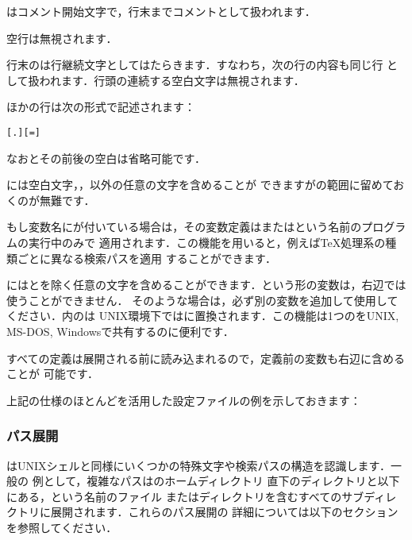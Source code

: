 \documentclass[uplatex,dvipdfmx]{jsarticle}
\begin{document}
\begin{itemize*}
\item \code{\%}はコメント開始文字で，行末までコメントとして扱われます．
\item 空行は無視されます．
\item 行末の\code{\bs}は行継続文字としてはたらきます．すなわち，次の行の内容も同じ行
  として扱われます．行頭の連続する空白文字は無視されます．
\item ほかの行は次の形式で記述されます：
%
\begin{alltt}
  [.] [=] 
\end{alltt}
%
  なお\samp{=}とその前後の空白は省略可能です．
\item {}には空白文字，\samp{=}，以外の任意の文字を含めることが
  できますがの範囲に留めておくのが無難です．
\item もし変数名にが付いている場合は，その変数定義はまたはという名前のプログラムの実行中のみで
  適用されます．この機能を用いると，例えば\TeX 処理系の種類ごとに異なる検索パスを適用
  することができます．
\item {}には\samp{\%}とを除く任意の文字を含めることができます．という形の変数は，右辺では使うことができません．
  そのような場合は，必ず別の変数を追加して使用してください．内の\samp{;}は
  UNIX環境下では\samp{:}に置換されます．この機能は1つのをUNIX, MS-DOS,
  Windowsで共有するのに便利です．
\item すべての定義は展開される前に読み込まれるので，定義前の変数も右辺に含めることが
  可能です．
\end{itemize*}
%
上記の仕様のほとんどを活用した設定ファイルの例を示しておきます：
%


\subsubsection{パス展開}
\label{sec:path-expansion}

\KPS はUNIXシェルと同様にいくつかの特殊文字や検索パスの構造を認識します．一般の
例として，複雑なパスはのホームディレクトリ
直下のディレクトリと以下にある，という名前のファイル
またはディレクトリを含むすべてのサブディレクトリに展開されます．これらのパス展開の
詳細については以下のセクションを参照してください．
\end{document}
